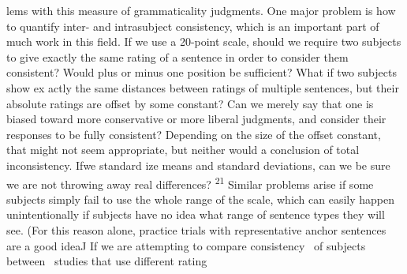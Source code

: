 \begin{styleTextbody}
lems with this measure of grammaticality judgments. One major problem is how to quantify inter- and intrasubject consistency, which is an important part of much work in this field. If we use a 20-point scale, should we require two subjects to give exactly the same rating of a sentence in order to consider them consistent? Would plus or minus one position be sufficient? What if two subjects show ex\- actly the same distances between ratings of multiple sentences, but their absolute ratings are offset by some constant? Can we merely say that one is biased toward more conservative or more liberal judgments, and consider their responses to be fully consistent? Depending on the size of the offset constant, that might not seem appropriate, but neither would a conclusion of total inconsistency. Ifwe standard\- ize means and standard deviations, can we be sure we are not throwing away real differences? \textsuperscript{21}\textsuperscript{ }Similar problems arise if some subjects simply fail to use the whole range of the scale, which can easily happen unintentionally if subjects have no idea what range of sentence types they will see. (For this reason alone, practice trials with representative anchor sentences are a good ideaJ If we are attempting to compare consistency \ of subjects between \ studies that use different rating
\end{styleTextbody}


